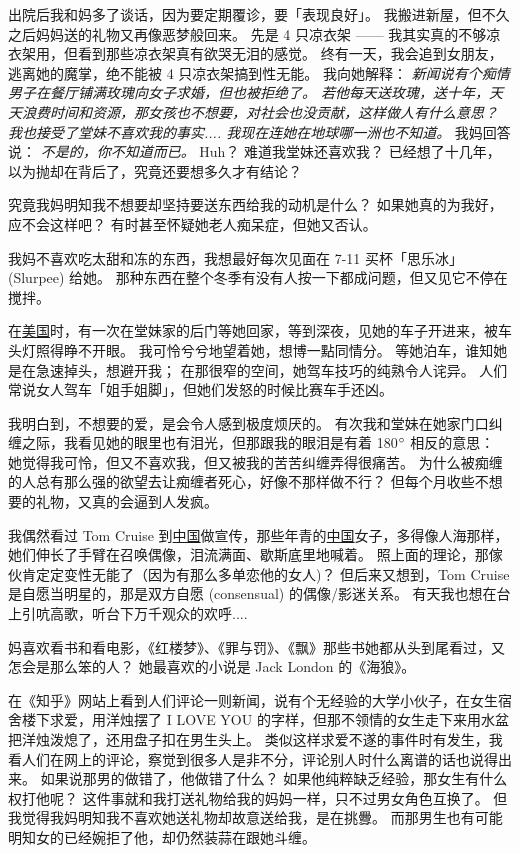 \documentclass[12pt]{report}
\newcommand{\speechCn}[1]{\textrm{\textit{\textcolor{Speech}{#1}}}}
\begin{document}
出院后我和妈多了谈话，因为要定期覆诊，要「表现良好」。 我搬进新屋，但不久之后妈妈送的礼物又再像恶梦般回来。 先是 4 只凉衣架 —— 我其实真的不够凉衣架用，但看到那些凉衣架真有欲哭无泪的感觉。 终有一天，我会追到女朋友，逃离她的魔掌，绝不能被 4 只凉衣架搞到性无能。 我向她解释： \speechCn{新闻说有个痴情男子在餐厅铺满玫瑰向女子求婚，但也被拒绝了。 若他每天送玫瑰，送十年，天天浪费时间和资源，那女孩也不想要，对社会也没贡献，这样做人有什么意思？ 我也接受了堂妹不喜欢我的事实.... 我现在连她在地球哪一洲也不知道。}  我妈回答说： \speechCn{不是的，你不知道而已。}  Huh？ 难道我堂妹还喜欢我？ 已经想了十几年，以为抛却在背后了，究竟还要想多久才有结论？

究竟我妈明知我不想要却坚持要送东西给我的动机是什么？ 如果她真的为我好，应不会这样吧？ 有时甚至怀疑她老人痴呆症，但她又否认。

我妈不喜欢吃太甜和冻的东西，我想最好每次见面在 7-11 买杯「思乐冰」(Slurpee) 给她。 那种东西在整个冬季有没有人按一下都成问题，但又见它不停在搅拌。

在\uline{美国}时，有一次在堂妹家的后门等她回家，等到深夜，见她的车子开进来，被车头灯照得睁不开眼。 我可怜兮兮地望着她，想博一點同情分。 等她泊车，谁知她是在急速掉头，想避开我； 在那很窄的空间，她驾车技巧的纯熟令人诧异。 人们常说女人驾车「姐手姐脚」，但她们发怒的时候比赛车手还凶。

我明白到，不想要的爱，是会令人感到极度烦厌的。 有次我和堂妹在她家门口纠缠之际，我看见她的眼里也有泪光，但那跟我的眼泪是有着 180$\degree$ 相反的意思： 她觉得我可怜，但又不喜欢我，但又被我的苦苦纠缠弄得很痛苦。 为什么被痴缠的人总有那么强的欲望去让痴缠者死心，好像不那样做不行？ 但每个月收些不想要的礼物，又真的会逼到人发疯。

我偶然看过 Tom Cruise 到\uline{中国}做宣传，那些年青的\uline{中国}女子，多得像人海那样，她们伸长了手臂在召唤偶像，泪流满面、歇斯底里地喊着。 照上面的理论，那傢伙肯定定变性无能了（因为有那么多单恋他的女人)？ 但后来又想到，Tom Cruise 是自愿当明星的，那是双方自愿 (consensual) 的偶像/影迷关系。 有天我也想在台上引吭高歌，听台下万千观众的欢呼....

妈喜欢看书和看电影，《红楼梦》、《罪与罚》、《飘》那些书她都从头到尾看过，又怎会是那么笨的人？ 她最喜欢的小说是 Jack London 的《海狼》。

在《知乎》网站上看到人们评论一则新闻，说有个无经验的大学小伙子，在女生宿舍楼下求爱，用洋烛摆了 I LOVE YOU 的字样，但那不领情的女生走下来用水盆把洋烛泼熄了，还用盘子扣在男生头上。  类似这样求爱不遂的事件时有发生，我看人们在网上的评论，察觉到很多人是非不分，评论别人时什么离谱的话也说得出来。 如果说那男的做错了，他做错了什么？  如果他纯粹缺乏经验，那女生有什么权打他呢？  这件事就和我打送礼物给我的妈妈一样，只不过男女角色互换了。  但我觉得我妈明知我不喜欢她送礼物却故意送给我，是在挑釁。  而那男生也有可能明知女的已经婉拒了他，却仍然装蒜在跟她斗缠。
\end{document}
